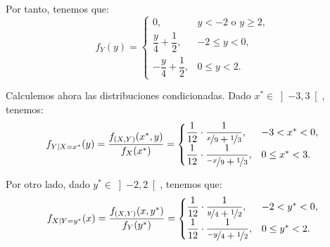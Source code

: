 \begin{ejercicio}
    Por tanto, tenemos que:
    \begin{equation*}
        f_Y(y) = \begin{cases}
            0, & y<-2 \text{ o } y\geq 2, \\
            \dfrac{y}{4} + \dfrac{1}{2}, & -2\leq y<0, \\
            -\dfrac{y}{4} + \dfrac{1}{2}, & 0\leq y<2.
        \end{cases}
    \end{equation*}

    Calculemos ahora las distribuciones condicionadas.
    Dado $x^\ast\in \left]-3,3\right[$, tenemos:
    \begin{equation*}
        f_{Y\mid X=x^\ast} (y) = \dfrac{f_{(X,Y)}(x^\ast, y)}{f_X(x^\ast)}
        = \begin{cases}
            \dfrac{1}{12}\cdot \dfrac{1}{\nicefrac{x}{9} + \nicefrac{1}{3}}, & -3< x^\ast<0, \\
            \dfrac{1}{12}\cdot \dfrac{1}{\nicefrac{-x}{9} + \nicefrac{1}{3}}, & 0\leq x^\ast<3.
        \end{cases}
    \end{equation*}

    Por otro lado, dado $y^\ast\in \left]-2,2\right[$, tenemos que:
    \begin{equation*}
        f_{X\mid Y=y^\ast} (x) = \dfrac{f_{(X,Y)}(x, y^\ast)}{f_Y(y^\ast)}
        = \begin{cases}
            \dfrac{1}{12}\cdot \dfrac{1}{\nicefrac{y}{4} + \nicefrac{1}{2}}, & -2< y^\ast<0, \\
            \dfrac{1}{12}\cdot \dfrac{1}{\nicefrac{-y}{4} + \nicefrac{1}{2}}, & 0\leq y^\ast<2.
        \end{cases}
    \end{equation*}
\end{ejercicio}


